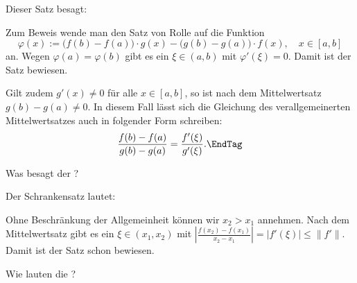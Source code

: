 \begin{antwort}
Dieser Satz besagt: 

\medskip
\noindent{}
Zum Beweis wende man den Satz von Rolle auf die 
Funktion
\[
\varphi( x ) := \big( f(b)-f(a) \big)\cdot g(x) - 
\big( g(b)-g(a) \big)\cdot f(x), \quad  x\in [a,b] 
\]
an. Wegen $\varphi(a)=\varphi(b)$ gibt es ein $\xi\in (a,b)$ 
mit $\varphi'(\xi)=0$. Damit ist der Satz bewiesen. 

Gilt zudem $g'(x) \not=0$ für alle $x\in [a,b]$, so 
ist nach dem Mittelwertsatz 
$g(b)-g(a) \not=0$. 
In diesem Fall lässt sich die Gleichung 
des verallgemeinerten Mittelwertsatzes auch in folgender Form schreiben:
\begin{equation}
\frac{f(b)-f(a)}{g(b)-g(a)} = \frac{f'(\xi)}{g'(\xi)} . \EndTag  
\end{equation}
\end{antwort}


\begin{frage}\label{06_schr}
Was besagt der ?
\end{frage}

\begin{antwort}
Der Schrankensatz lautet: 

\medskip
\noindent{}

\medskip\noindent
Ohne Beschränkung der Allgemeinheit können wir $x_2>x_1$ annehmen. 
Nach dem Mittelwertsatz gibt es ein $\xi \in (x_1,x_2)$ mit $
\left| \frac{ f(x_2)-f(x_1) }{ x_2-x_1 } \right| = |f'( \xi )| \le \|f'\|.$
Damit ist der Satz schon bewiesen. 
\AntEnd
\end{antwort}



\begin{frage}
Wie lauten die ?
\end{frage}
\begin{antwort}
\AntEnd
\end{antwort}

